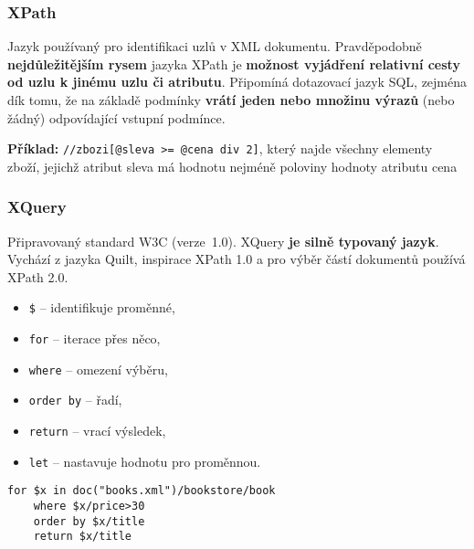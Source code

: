 \subsubsection{XPath}
Jazyk používaný pro identifikaci uzlů v XML dokumentu. Pravděpodobně \textbf{nejdůležitějším rysem} jazyka XPath je \textbf{možnost vyjádření relativní cesty od uzlu k jinému uzlu či atributu}. Připomíná dotazovací jazyk SQL, zejména dík tomu, že na základě podmínky \textbf{vrátí jeden nebo množinu výrazů} (nebo žádný) odpovídající vstupní podmínce.

\textbf{Příklad:} \texttt{//zbozi[@sleva >= @cena div 2]}, který najde všechny elementy zboží, jejichž atribut sleva má hodnotu nejméně poloviny hodnoty atributu cena

\subsubsection{XQuery}
Připravovaný standard W3C (verze 1.0). XQuery \textbf{je silně typovaný jazyk}. Vychází z jazyka Quilt, inspirace XPath 1.0 a pro výběr částí dokumentů používá XPath 2.0.
\bigskip\\
\begin{minipage}[t]{0.5\textwidth}
	\begin{itemize}
		\item \texttt{\$} -- identifikuje proměnné,
		\item \texttt{for} -- iterace přes něco,
		\item \texttt{where} -- omezení výběru,
		\item \texttt{order by} -- řadí,
		\item \texttt{return} -- vrací výsledek,
		\item \texttt{let} -- nastavuje hodnotu pro proměnnou.
	\end{itemize}
\end{minipage}
\begin{minipage}[t]{0.5\textwidth}
	\begin{verbatim}
for $x in doc("books.xml")/bookstore/book
	where $x/price>30
	order by $x/title
	return $x/title
	\end{verbatim}
\end{minipage}
